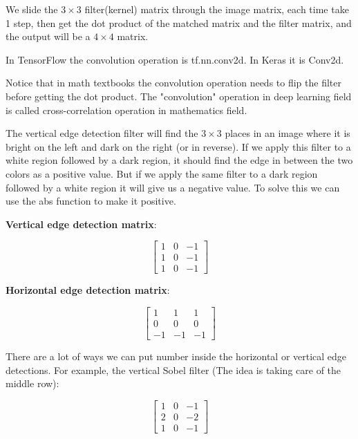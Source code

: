 \documentclass{article}
\begin{document}
\noindent We slide the \(3 \times 3\) filter(kernel) matrix through the image matrix, each time take 1 step, then get the dot product of the matched matrix and the filter matrix, and the output will be a \(4 \times 4\) matrix.

\bigskip

\noindent In TensorFlow the convolution operation is tf.nn.conv2d. In Keras it is Conv2d.

\bigskip

\noindent Notice that in math textbooks the convolution operation needs to flip the filter before getting the dot product. The "convolution" operation in deep learning field is called cross-correlation operation in mathematics field.

\bigskip

\noindent The vertical edge detection filter will find the \(3 \times 3\) places in an image where it is bright on the left and dark on the right (or in reverse). If we apply this filter to a white region followed by a dark region, it should find the edge in between the two colors as a positive value. But if we apply the same filter to a dark region followed by a white region it will give us a negative value. To solve this we can use the abs function to make it positive.

\bigskip

\noindent \textbf{Vertical edge detection matrix}:

\[
\begin{bmatrix}
1 & 0 & -1\\
1 & 0 & -1\\
1 & 0 & -1
\end{bmatrix}
\]

\noindent \textbf{Horizontal edge detection matrix}:

\[
\begin{bmatrix}
1 & 1 & 1\\
0 & 0 & 0\\
-1 & -1 & -1
\end{bmatrix}
\]

\noindent There are a lot of ways we can put number inside the horizontal or vertical edge detections. For example, the vertical Sobel filter (The idea is taking care of the middle row):

\[
\begin{bmatrix}
1 & 0 & -1\\
2 & 0 & -2\\
1 & 0 & -1
\end{bmatrix}
\]
\end{document}
